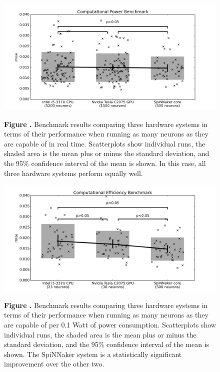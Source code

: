 \documentclass{frontiersSCNS} %
\begin{document}
\begin{figure}[h!]
\begin{center}
\includegraphics[width=18cm]{figures/plot_compute}
\end{center}
 \textbf{\label{fig:analysis_compute} Figure .}{ Benchmark results comparing three hardware systems
     in terms of their performance when running as many neurons as they are capable of in real time.  Scatterplots show individual runs, the 
     shaded area is the mean plus or minus the standard deviation, and the 95\% confidence interval of the mean is shown.  In this case,
     all three hardware systems perform equally well.}
\end{figure}

\begin{figure}[h!]
\begin{center}
\includegraphics[width=18cm]{figures/plot_power}
\end{center}
 \textbf{\label{fig:analysis_power} Figure .}{ Benchmark results comparing three hardware systems
     in terms of their performance when running as many neurons as they are capable of per 0.1 Watt of power consumption.  Scatterplots show individual runs, the 
     shaded area is the mean plus or minus the standard deviation, and the 95\% confidence interval of the mean is shown.  The SpiNNaker system is a statistically
 significant improvement over the other two.}
\end{figure}
\end{document}
